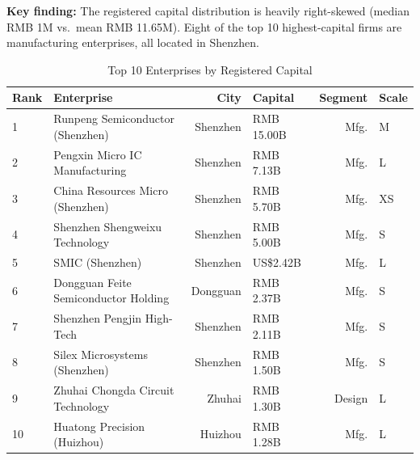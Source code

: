\documentclass[12pt,a4paper]{article}
\newcommand{\tableHeaderRow}{\rowcolor{tealPrimary}\color{white}}
\newcommand{\tableOddRow}{\rowcolor{mintBG}}
\newcommand{\tableEvenRow}{\rowcolor{white}}
\begin{document}
\textbf{Key finding:} The registered capital distribution is heavily right-skewed
(median RMB 1M vs.\ mean RMB 11.65M). Eight of the top 10 highest-capital firms
are manufacturing enterprises, all located in Shenzhen.

\begin{table}[H]
\centering
\small
\caption{Top 10 Enterprises by Registered Capital}
\label{tab:capital_top10}
\begin{tabular}{llrlrl}
\toprule
\tableHeaderRow
\textbf{Rank} & \textbf{Enterprise} & \textbf{City} & \textbf{Capital} & \textbf{Segment} & \textbf{Scale} \\
\midrule
\tableOddRow  1  & Runpeng Semiconductor (Shenzhen)      & Shenzhen & RMB 15.00B  & Mfg. & M \\
\tableEvenRow 2  & Pengxin Micro IC Manufacturing        & Shenzhen & RMB 7.13B   & Mfg. & L \\
\tableOddRow  3  & China Resources Micro (Shenzhen)      & Shenzhen & RMB 5.70B   & Mfg. & XS \\
\tableEvenRow 4  & Shenzhen Shengweixu Technology        & Shenzhen & RMB 5.00B   & Mfg. & S \\
\tableOddRow  5  & SMIC (Shenzhen)                       & Shenzhen & US\$2.42B   & Mfg. & L \\
\tableEvenRow 6  & Dongguan Feite Semiconductor Holding  & Dongguan & RMB 2.37B   & Mfg. & S \\
\tableOddRow  7  & Shenzhen Pengjin High-Tech            & Shenzhen & RMB 2.11B   & Mfg. & S \\
\tableEvenRow 8  & Silex Microsystems (Shenzhen)         & Shenzhen & RMB 1.50B   & Mfg. & S \\
\tableOddRow  9  & Zhuhai Chongda Circuit Technology     & Zhuhai   & RMB 1.30B   & Design & L \\
\tableEvenRow 10 & Huatong Precision (Huizhou)            & Huizhou  & RMB 1.28B   & Mfg. & L \\
\bottomrule
\end{tabular}
\end{table}
\end{document}
